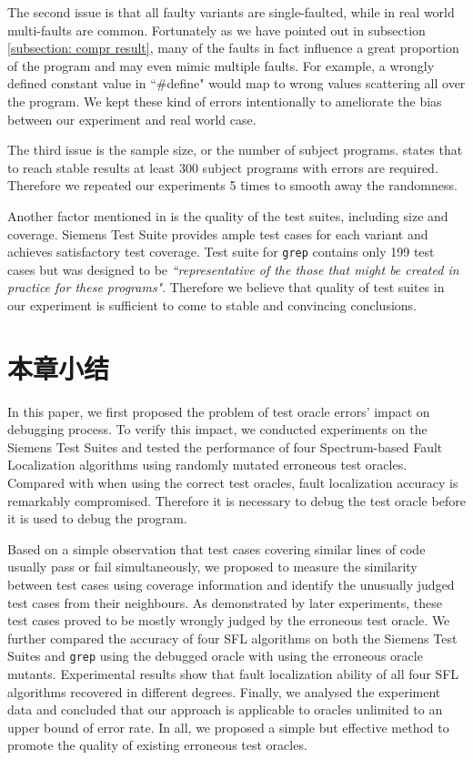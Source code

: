 The second issue is that all faulty variants are single-faulted, while in real world multi-faults are common. Fortunately as we have pointed out in subsection \ref{subsection: compr result}, many of the faults in fact influence a great proportion of the program and may even mimic multiple faults. For example, a wrongly defined constant value in  ``\#define" would map to wrong values scattering all over the program. We kept these kind of errors intentionally to ameliorate the bias between our experiment and real world case.

The third issue is the sample size, or the number of subject programs. \cite{Steimann:2013:TVV:2483760.2483767} states that to reach stable results at least 300 subject programs with errors are required. Therefore we repeated our experiments 5 times to smooth away the randomness.

Another factor mentioned in \cite{Steimann:2013:TVV:2483760.2483767} is the quality of the test suites, including size and coverage. Siemens Test Suite provides ample test cases for each variant and achieves satisfactory test coverage. Test suite for \texttt{grep} contains only 199 test cases but was designed to be \textit{``representative of the those that might be created in practice for these programs"}\cite{doESE05}. Therefore we believe that quality of test suites in our experiment is sufficient to come to stable and convincing conclusions.



\section{本章小结}

In this paper, we first proposed the problem of test oracle errors' impact on debugging process. To verify this impact, we conducted experiments on the Siemens Test Suites and tested the performance of four Spectrum-based Fault Localization algorithms using randomly mutated erroneous test oracles. Compared with when using the correct test oracles, fault localization accuracy is remarkably compromised. Therefore it is necessary to debug the test oracle before it is used to debug the program.

Based on a simple observation that test cases covering similar lines of code usually pass or fail simultaneously, we proposed to measure the similarity between test cases using coverage information and identify the unusually judged test cases from their neighbours. As demonstrated by later experiments, these test cases proved to be mostly wrongly judged by the erroneous test oracle. We further compared the accuracy of four SFL algorithms on both the Siemens Test Suites and \texttt{grep} using the debugged oracle with using the erroneous oracle mutants. Experimental results show that fault localization ability of all four SFL algorithms recovered in different degrees. Finally, we analysed the experiment data and concluded that our approach is applicable to oracles unlimited to an upper bound of error rate. In all, we proposed a simple but effective method to promote the quality of existing erroneous test oracles.

